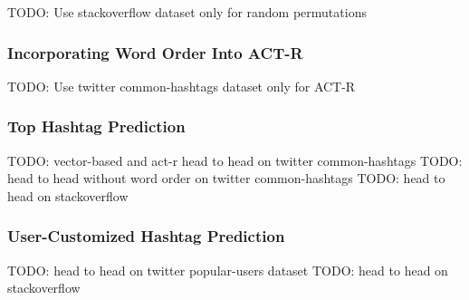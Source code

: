 \documentclass[man]{apa6}
\begin{document}
TODO: Use stackoverflow dataset only for random permutations

\subsubsection{Incorporating Word Order Into ACT-R}

TODO: Use twitter common-hashtags dataset only for ACT-R

\subsubsection{Top Hashtag Prediction}

TODO: vector-based and act-r head to head on twitter common-hashtags
TODO: head to head without word order on twitter common-hashtags
TODO: head to head on stackoverflow

\subsubsection{User-Customized Hashtag Prediction}

TODO: head to head on twitter popular-users dataset
TODO: head to head on stackoverflow

\begingroup
{}
\setlength\bibitemsep{12pt}
\printbibliography
\endgroup
\end{document}
